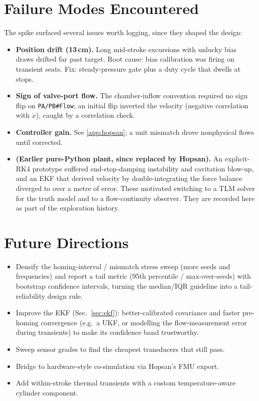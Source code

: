 \section{Failure Modes Encountered}\label{app:bugs}
The spike surfaced several issues worth logging, since they shaped the design:
\begin{itemize}
\item \textbf{Position drift (13\,cm).} Long mid-stroke excursions with unlucky
bias draws drifted far past target. Root cause: bias calibration was firing on
transient seats. Fix: steady-pressure gate plus a duty cycle that dwells at
stops.
\item \textbf{Sign of valve-port flow.} The chamber-inflow convention required no
sign flip on \texttt{PA/PB\#Flow}; an initial flip inverted the velocity (negative
correlation with $\dot x$), caught by a correlation check.
\item \textbf{Controller gain.} See \ref{app:hopsan}; a unit mismatch drove
nonphysical flows until corrected.
\item \textbf{(Earlier pure-Python plant, since replaced by Hopsan).} An
explicit-RK4 prototype suffered end-stop-damping instability and cavitation
blow-up, and an EKF that derived velocity by double-integrating the force balance
diverged to over a metre of error. These motivated switching to a TLM solver for
the truth model and to a flow-continuity observer. They are recorded here as part
of the exploration history.
\end{itemize}

\section{Future Directions}\label{app:future}
\begin{itemize}
\item Densify the homing-interval / mismatch stress sweep (more seeds and
frequencies) and report a tail metric (95th percentile / max-over-seeds) with
bootstrap confidence intervals, turning the median/IQR guideline into a
tail-reliability design rule.
\item Improve the EKF (Sec.~\ref{sec:ekf}): better-calibrated covariance and
faster pre-homing convergence (e.g.\ a UKF, or modelling the flow-measurement
error during transients) to make its confidence band trustworthy.
\item Sweep sensor grades to find the cheapest transducers that still pass.
\item Bridge to hardware-style co-simulation via Hopsan's FMU export.
\item Add within-stroke thermal transients with a custom temperature-aware
cylinder component.
\end{itemize}

